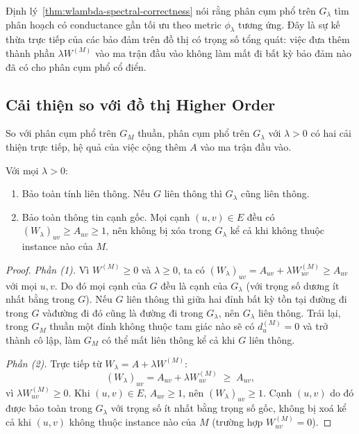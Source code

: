 Định lý~\ref{thm:wlambda-spectral-correctness} nói rằng phân cụm phổ trên $G_\lambda$ tìm phân hoạch có conductance gần tối ưu theo metric $\phi_\lambda$ tương ứng. Đây là sự kế thừa trực tiếp của các bảo đảm trên đồ thị có trọng số tổng quát: việc đưa thêm thành phần $\lambda W^{(M)}$ vào ma trận đầu vào không làm mất đi bất kỳ bảo đảm nào đã có cho phân cụm phổ cổ điển.

\subsection{Cải thiện so với đồ thị Higher Order}
\label{subsec:improvement-vs-gm}

So với phân cụm phổ trên $G_M$ thuần, phân cụm phổ trên $G_\lambda$ với $\lambda > 0$ có hai cải thiện trực tiếp, hệ quả của việc cộng thêm $A$ vào ma trận đầu vào.

\begin{proposition}
\label{prop:wlambda-fixes-gm}
Với mọi $\lambda > 0$:
\begin{enumerate}[topsep=4pt, itemsep=4pt, parsep=0pt]
    \item Bảo toàn tính liên thông. Nếu $G$ liên thông thì $G_\lambda$ cũng liên thông.
    \item Bảo toàn thông tin cạnh gốc. Mọi cạnh $(u, v) \in E$ đều có $(W_\lambda)_{uv} \geq A_{uv} \geq 1$, nên không bị xóa trong $G_\lambda$ kể cả khi không thuộc instance nào của $M$.
\end{enumerate}
\end{proposition}

\begin{proof}

\emph{Phần (1).} Vì $W^{(M)} \geq 0$ và $\lambda \geq 0$, ta có $(W_\lambda)_{uv} = A_{uv} + \lambda W^{(M)}_{uv} \geq A_{uv}$ với mọi $u, v$. Do đó mọi cạnh của $G$ đều là cạnh của $G_\lambda$ (với trọng số dương ít nhất bằng trong $G$). Nếu $G$ liên thông thì giữa hai đỉnh bất kỳ tồn tại đường đi trong $G$ vàđường đi đó cũng là đường đi trong $G_\lambda$, nên $G_\lambda$ liên thông. Trái lại, trong $G_M$ thuần một đỉnh không thuộc tam giác nào sẽ có $d_u^{(M)} = 0$ và trở thành cô lập, làm $G_M$ có thể mất liên thông kể cả khi $G$ liên thông.

\emph{Phần (2).} Trực tiếp từ $W_\lambda = A + \lambda W^{(M)}$:
\[
    (W_\lambda)_{uv} = A_{uv} + \lambda W^{(M)}_{uv} \;\geq\; A_{uv},
\]
vì $\lambda W^{(M)}_{uv} \geq 0$. Khi $(u, v) \in E$, $A_{uv} \geq 1$, nên $(W_\lambda)_{uv} \geq 1$. Cạnh $(u, v)$ do đó được bảo toàn trong $G_\lambda$ với trọng số ít nhất bằng trọng số gốc, không bị xoá kể cả khi $(u, v)$ không thuộc instance nào của $M$ (trường hợp $W^{(M)}_{uv} = 0$).
\end{proof}

